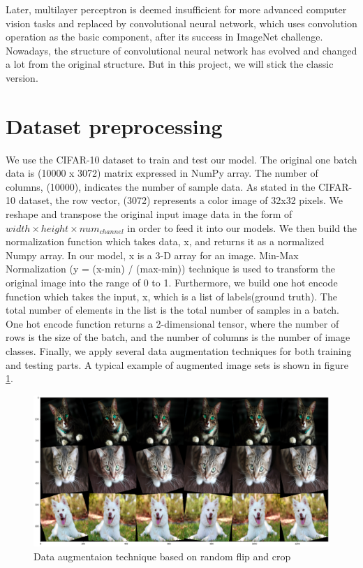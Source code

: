 \documentclass[11pt]{scrartcl}
\begin{document}
Later, multilayer perceptron is deemed insufficient for more advanced computer vision tasks and replaced by convolutional neural network\cite{krizhevsky2012imagenet}, which uses convolution operation as the basic component, after its success in ImageNet challenge\cite{deng2009imagenet}. Nowadays, the structure of convolutional neural network has evolved and changed a lot from the original structure. But in this project, we will stick the classic version.



\section{Dataset preprocessing}
We use the CIFAR-10 dataset to train and test our model. The original one batch data is (10000 x 3072) matrix expressed in NumPy array. The number of columns, (10000), indicates the number of sample data. As stated in the CIFAR-10 dataset, the row vector, (3072) represents a color image of 32x32 pixels. 
We reshape and transpose the original input image data in the form of $width \times height \times num_{channel}$ in order to feed it into our models.
We then build the normalization function which takes data, x, and returns it as a normalized Numpy array. In our model, x is a  3-D array for an image. Min-Max Normalization (y = (x-min) / (max-min)) technique is used to transform the original image into the range of 0 to 1. 
Furthermore, we build one hot encode function which takes the input, x, which is a list of labels(ground truth). The total number of elements in the list is the total number of samples in a batch. One hot encode function returns a 2-dimensional tensor, where the number of rows is the size of the batch, and the number of columns is the number of image classes.
Finally, we apply several data augmentation techniques for both training and testing parts. A typical example of augmented image sets is shown in figure \ref{data_aug}.

\begin{figure}[H]
	\centering
	\includegraphics[width=0.9\linewidth]{fig/random_flip_crop_padding.png}
	\caption{Data augmentaion technique based on random flip and crop}
	\label{data_aug}
\end{figure}
\end{document}

